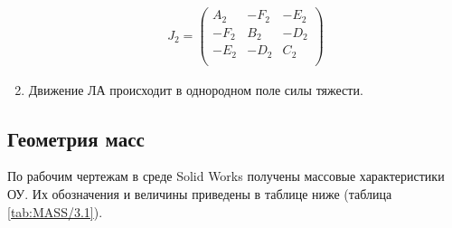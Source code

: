 \begin{enumerate}
	\begin{equation}
	\label{eq:p3:7}
	\begin{alignedat}{2}
	J_{2}= \left( \begin{matrix}
	A_{2} & -F_{2} & -E_{2}\\
	-F_{2} & B_{2} & -D_{2}\\
	-E_{2} & -D_{2} & C_{2}\\
	\end{matrix}
	\right) 
	\end{alignedat}
	\end{equation}	
	\item Движение ЛА происходит в однородном поле силы тяжести.
\end{enumerate}


\subsection{Геометрия масс} \label{sec:ch3/sec4}

По рабочим чертежам в среде Solid Works получены массовые характеристики ОУ. Их обозначения и величины приведены в таблице ниже (таблица \ref{tab:MASS/3.1}).



